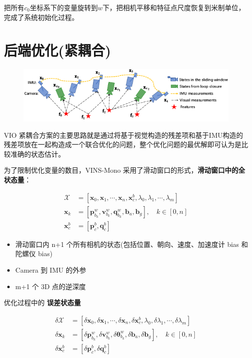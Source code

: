 \documentclass[12pt,a4paper]{article}
\begin{document}
把所有$c_0$坐标系下的变量旋转到$w$下，把相机平移和特征点尺度恢复到米制单位，完成了系统初始化过程。


\section{后端优化(紧耦合)}

\begin{figure}[htbp]
\centering
\includegraphics[scale=0.6]{images/sliding_window_vio.png}
\end{figure}

VIO 紧耦合方案的主要思路就是通过将基于视觉构造的残差项和基于IMU构造的残差项放在一起构造成一个联合优化的问题，整个优化问题的最优解即可认为是比较准确的状态估计。

为了限制优化变量的数目，VINS-Mono 采用了滑动窗口的形式，\textbf{滑动窗口中的全状态量}：

\begin{equation}
\begin{aligned}
\mathcal{X} 
&= 
\left[
\mathbf{x}_{0},\mathbf{x}_{1},\cdots,\mathbf{x}_{n},\mathbf{x}^{b}_{c},{\lambda}_{0},{\lambda}_{1}, \cdots ,{\lambda}_{m}
\right]  
\\
\mathbf{x}_{k} 
&= 
\left[
\mathbf{p}^{w}_{b_{k}},\mathbf{v}^{w}_{b_{k}},\mathbf{q}^{w}_{b_{k}},\mathbf{b}_{a},\mathbf{b}_{g}
\right], \quad k \in [0,n] 
\\
\mathbf{x}^{b}_{c} &= \left[ \mathbf{p}^{b}_{c}, \mathbf{q}^{b}_{c} \right]
\end{aligned}
\end{equation}

\begin{itemize}
\item 滑动窗口内 n+1 个所有相机的状态(包括位置、朝向、速度、加速度计 bias 和陀螺仪 bias)
\item Camera 到 IMU 的外参
\item m+1 个 3D 点的逆深度
\end{itemize}

优化过程中的 \textbf{误差状态量}

\begin{equation}
\begin{aligned}
\delta \mathcal{X}
&=
\left[
\delta \mathbf{x}_{0}, \delta \mathbf{x}_{1}, \cdots, \delta \mathbf{x}_{n}, \delta \mathbf{x}^{b}_{c}, \lambda_{0}, \delta \lambda_{1}, \cdots, \delta \lambda_{m}
\right] 
\\
\delta \mathbf{x}_{k}
&=
\left[
\delta \mathbf{p}^{w}_{b_{k}}, \delta \mathbf{v}^{w}_{b_{k}}, \delta \boldsymbol{\theta}^{w}_{b_{k}}, \delta \mathbf{b}_{a}, \delta \mathbf{b}_{g}
\right], \quad k \in [0,n] \\
\delta \mathbf{x}^{b}_{c} &= \left[ \delta \mathbf{p}^{b}_{c}, \delta \mathbf{q}^{b}_{c} \right] 
\end{aligned}
\end{equation}
\end{document}
